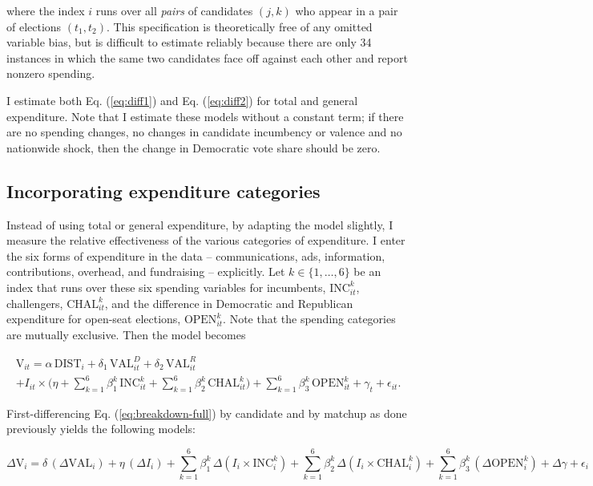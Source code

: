 \documentclass{article}
\begin{document}
where the index $i$ runs over all \textit{pairs} of candidates $(j, k)$ who appear in a pair of elections $(t_1, t_2)$. This specification is theoretically free of any omitted variable bias, but is difficult to estimate reliably because there are only 34 instances in which the same two candidates face off against each other and report nonzero spending.

I estimate both Eq. (\ref{eq:diff1}) and Eq. (\ref{eq:diff2}) for total and general expenditure. Note that I estimate these models without a constant term; if there are no spending changes, no changes in candidate incumbency or valence and no nationwide shock, then the change in Democratic vote share should be zero.

\subsection{Incorporating expenditure categories}

Instead of using total or general expenditure, by adapting the model slightly, I measure the relative effectiveness of the various categories of expenditure. I enter the six forms of expenditure in the data -- communications, ads, information, contributions, overhead, and fundraising -- explicitly. Let $k\in \{1,\ldots,6\}$ be an index that runs over these six spending variables for incumbents, $\text{INC}_{it}^k$, challengers, $\text{CHAL}_{it}^k$, and the difference in Democratic and Republican expenditure for open-seat elections, $\text{OPEN}_{it}^k$. Note that the spending categories are mutually exclusive. Then the model becomes

\begin{multline}
\text{V}_{it} = \alpha \, \text{DIST}_i + \delta_1 \, \text{VAL}^{D}_{it} + \delta_2 \, \text{VAL}^{R}_{it} \\ + I_{it} \times \bigg( \eta + \sum \limits_{k=1}^6 \beta^k_1 \, \text{INC}^k_{it} + \sum \limits_{k=1}^6 \beta^k_2 \, \text{CHAL}^k_{it} \bigg) + \sum \limits_{k=1}^6  \beta^k_3 \, \text{OPEN}^k_{it} + \gamma_t + \epsilon_{it}.
\label{eq:breakdown-full}
\end{multline}

First-differencing Eq. (\ref{eq:breakdown-full}) by candidate and by matchup as done previously yields the following models:

\begin{equation}
\Delta \text{V}_{i} = \delta \, (\Delta \text{VAL}_i) + \eta \, (\Delta I_{i}) + \sum \limits_{k=1}^6 \beta^k_1 \, \Delta ( I_i \times \text{INC}^k_{i} ) + \sum \limits_{k=1}^6 \beta^k_2 \, \Delta ( I_i \times \text{CHAL}^k_{i} ) + \sum \limits_{k=1}^6 \beta_3^k \, (\Delta \text{OPEN}^k_{i}) + \Delta \gamma + \epsilon_{i}
\label{eq:breakdown-diff1}
\end{equation}
\end{document}
